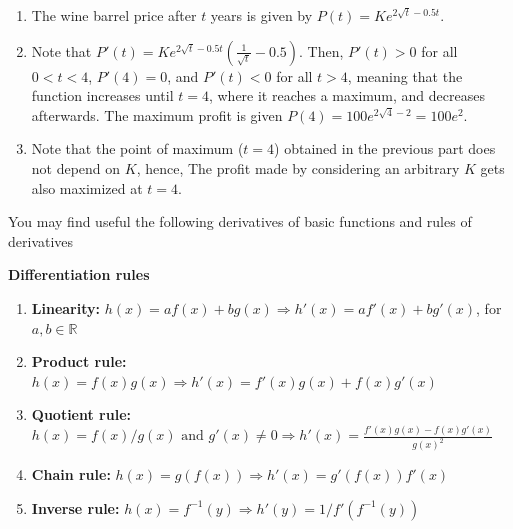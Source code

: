 \documentclass[11pt]{exam}
\newcommand{\R}{\mathbb{R}} %
\begin{document}
\begin{questions}
\begin{enumerate}[leftmargin = 0.5cm, label = (\alph*), rightmargin = 0.2cm]
    \end{enumerate}

\begin{solution}[0cm]
    \begin{enumerate}[leftmargin = 0.5cm, label = (\alph*), rightmargin = 0.2cm]
        
        \item The wine barrel price after $t$ years is given by $P(t) = Ke^{2\sqrt{t} - 0.5t}$.

        \item Note that $P'(t) = Ke^{2\sqrt{t} - 0.5t}\left(\frac{1}{\sqrt{t}} - 0.5\right)$. Then, $P'(t) > 0$ for all $0 < t < 4$, $P'(4) = 0$, and $P'(t) < 0$ for all $t > 4$, meaning that the function increases until $t = 4$, where it reaches a maximum, and decreases afterwards. The maximum profit is given $P(4) = 100e^{2\sqrt{4} - 2} = 100e^2$.

        \item Note that the point of maximum ($t = 4$) obtained in the previous part does not depend on $K$, hence, The profit made by considering an arbitrary $K$ gets also maximized at $t = 4$.
        
    \end{enumerate}
\end{solution}

\end{questions}	

\begin{center}
You may find useful the following derivatives of basic functions and rules of derivatives
\end{center}

\begin{center}
    \textbf{Differentiation rules}
\end{center}
        
        \begin{enumerate}[leftmargin = 0.5cm, label = , rightmargin = 0.2cm]

        \item \textbf{Linearity:} $h(x) = a f(x) + b g(x) \Longrightarrow h'(x) = a f'(x) + b g'(x)$, for $a, b \in\R$

        \item \textbf{Product rule:} $h(x) = f(x)g(x) \Longrightarrow h'(x) = f'(x)g(x) + f(x)g'(x)$

        \item \textbf{Quotient rule:} $h(x) = f(x)/g(x) \text{ and } g'(x) \neq 0 \Longrightarrow h'(x) = \frac{f'(x)g(x) - f(x)g'(x)}{g(x)^2}$

        \item \textbf{Chain rule:} $h(x) = g(f(x)) \Longrightarrow h'(x) = g'(f(x))f'(x)$

        \item \textbf{Inverse rule:} $h(x) = f^{-1}(y) \Longrightarrow h'(y) = 1/f'(f^{-1}(y))$
        
        \end{enumerate}
\end{document}
